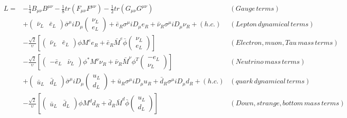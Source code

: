 \begin{equation}
 \begin{alignedat}{2}
  L = & -\frac{1}{4}B_{\mu\nu}B^{\mu\nu} - \frac{1}{8}tr(F_{\mu\nu}F^{\mu\nu}) - \frac{1}{2}tr(G_{\mu\nu}G^{\mu\nu}) & (Gauge \, terms) \\
      & +\begin{pmatrix} \bar{\nu}_{L} & \bar{e}_{L} \end{pmatrix}\bar{\sigma}^{\mu}iD_{\mu}\begin{pmatrix} \nu_{L} \\ e_{L} \end{pmatrix} + \bar{e}_{R}\sigma^{\mu}iD_{\mu}e_{R} + \bar{\nu}_{R}\sigma^{\mu}iD_{\mu}\nu_{R} + (h.c.) & (Lepton \, dynamical \, terms) \\
      & -\frac{\sqrt{2}}{\upsilon}[\begin{pmatrix} \bar{\nu}_{L} & \bar{e}_{L} \end{pmatrix}\phi M^{e}e_{R} + \bar{e}_{R}\bar{M}^{e}\bar{\phi}\begin{pmatrix} \nu_{L} \\ e_{L} \end{pmatrix}] & (Electron, muon, Tau \, mass \, terms) \\
      & -\frac{\sqrt{2}}{\upsilon}[\begin{pmatrix} -\bar{e}_{L} & \bar{\nu}_{L} \end{pmatrix}\phi^{*} M^{\nu}\nu_{R} + \bar{\nu}_{R}\bar{M}^{\nu}\phi^{T}\begin{pmatrix} -e_{L} \\ \nu_{L} \end{pmatrix}] & (Neutrino \, mass \, terms) \\
      & +\begin{pmatrix} \bar{u}_{L} & \bar{d}_{L} \end{pmatrix}\bar{\sigma}^{\mu}iD_{\mu}\begin{pmatrix} u_{L} \\ d_{L} \end{pmatrix} + \bar{u}_{R}\sigma^{\mu}iD_{\mu}u_{R} + \bar{d}_{R}\sigma^{\mu}iD_{\mu}d_{R} + (h.c.) & (quark \, dynamical \, terms) \\
      & -\frac{\sqrt{2}}{\upsilon}[\begin{pmatrix} \bar{u}_{L} & \bar{d}_{L} \end{pmatrix}\phi M^{d}d_{R} + \bar{d}_{R}\bar{M}^{d}\bar{\phi}\begin{pmatrix} u_{L} \\ d_{L} \end{pmatrix}] & (Down, strange, bottom \, mass \, terms) \\

\end{alignedat}
\end{equation}
